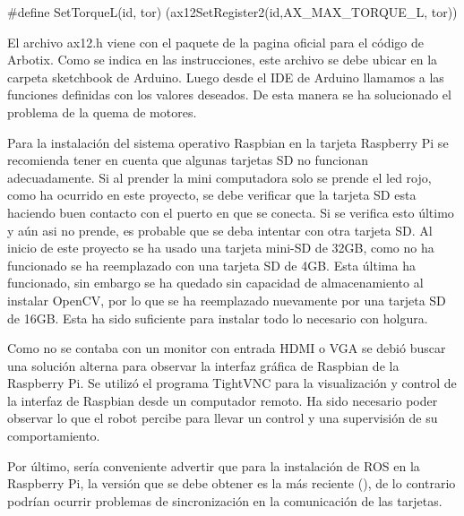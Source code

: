 \#define SetTorqueL(id, tor) (ax12SetRegister2(id,AX\_MAX\_TORQUE\_L, tor)) 

El archivo ax12.h viene con el paquete de la pagina oficial para el código de Arbotix. Como se indica en las instrucciones, este archivo se debe ubicar en la carpeta sketchbook de Arduino. Luego desde el IDE de Arduino llamamos a las funciones definidas con los valores deseados. De esta manera se ha solucionado el problema de la quema de motores.

Para la instalación del sistema operativo Raspbian en la tarjeta Raspberry Pi se recomienda tener en cuenta que algunas tarjetas SD no funcionan adecuadamente. Si al prender la mini computadora solo se prende el led rojo, como ha ocurrido en este proyecto, se debe verificar que la tarjeta SD esta haciendo buen contacto con el puerto en que se conecta. Si se verifica esto último y aún asi no prende, es probable que se deba intentar con otra tarjeta SD. Al inicio de este proyecto se ha usado una tarjeta mini-SD de 32GB, como no ha funcionado se ha reemplazado con una tarjeta SD de 4GB. Esta última ha funcionado, sin embargo se ha quedado sin capacidad de almacenamiento al instalar OpenCV, por lo que se ha reemplazado nuevamente por una tarjeta SD de 16GB. Esta ha sido suficiente para instalar todo lo necesario con holgura.    

Como no se contaba con un monitor con entrada HDMI o VGA se debió buscar una solución alterna para observar la interfaz gráfica de Raspbian de la Raspberry Pi. Se utilizó el programa TightVNC para la visualización y control de la interfaz de Raspbian desde un computador remoto. Ha sido necesario poder observar lo que el robot percibe para llevar un control y una supervisión de su comportamiento. 

Por último, sería conveniente advertir que para la instalación de ROS en la Raspberry Pi, la versión que se debe obtener es la más reciente (), de lo contrario podrían ocurrir problemas de sincronización en la comunicación de las tarjetas.   



